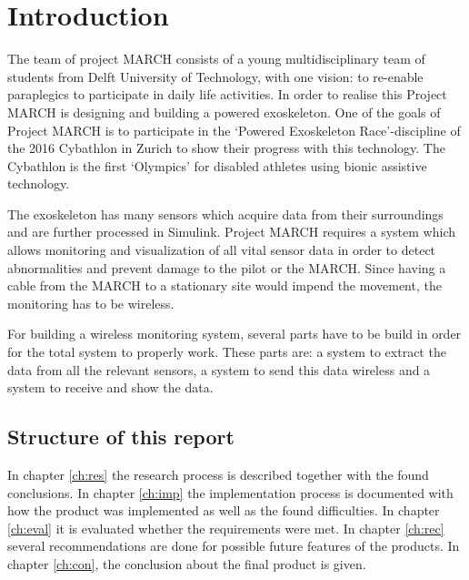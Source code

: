 \chapter{Introduction}
The team of project MARCH consists of a young multidisciplinary team of students from Delft University of Technology, with one vision: to re-enable paraplegics to participate in daily life activities. In order to realise this Project MARCH is designing and building a powered exoskeleton. One of the goals of Project MARCH is to participate in the ‘Powered Exoskeleton Race’-discipline of the 2016 Cybathlon in Zurich to show their progress with this technology. The Cybathlon is the first ‘Olympics’ for disabled athletes using bionic assistive technology.
 
The exoskeleton has many sensors which acquire data from their surroundings and are further processed in Simulink. Project MARCH requires a system which allows monitoring and visualization of all vital sensor data in order to detect abnormalities and prevent damage to the pilot or the MARCH. Since having a cable from the MARCH to a stationary site would impend the movement, the monitoring has to be wireless. 		

For building a wireless monitoring system, several parts have to be build in order for the total system to properly work. These parts are: a system to extract the data from all the relevant sensors, a system to send this data wireless and a system to receive and show the data.

\section{Structure of this report}
In chapter \ref{ch:res} the research process is described together with the found conclusions. In chapter \ref{ch:imp} the implementation process is documented with how the product was implemented as well as the found difficulties. In chapter \ref{ch:eval} it is evaluated whether the requirements were met. In chapter \ref{ch:rec} several recommendations are done for possible future features of the products.  In chapter \ref{ch:con}, the conclusion about the final product is given.
